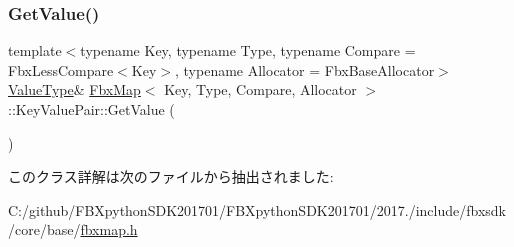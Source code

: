\mbox{\label{class_fbx_map_1_1_key_value_pair_ab06a5a6b1f2d03ae14a98a91cdfac643}} 
\subsubsection{\texorpdfstring{Get\+Value()}{GetValue()}\hspace{0.1cm}{\footnotesize\ttfamily [2/2]}}
{\footnotesize\ttfamily template$<$typename Key, typename Type, typename Compare = Fbx\+Less\+Compare$<$\+Key$>$, typename Allocator = Fbx\+Base\+Allocator$>$ \\
\hyperlink{class_fbx_map_1_1_key_value_pair_a716c83c1f6dabf173132b5acde84a9fe}{Value\+Type}\& \hyperlink{class_fbx_map}{Fbx\+Map}$<$ Key, Type, Compare, Allocator $>$\+::Key\+Value\+Pair\+::\+Get\+Value (\begin{DoxyParamCaption}{ }\end{DoxyParamCaption})}



このクラス詳解は次のファイルから抽出されました\+:\begin{DoxyCompactItemize}
\item 
C\+:/github/\+F\+B\+Xpython\+S\+D\+K201701/\+F\+B\+Xpython\+S\+D\+K201701/2017./include/fbxsdk/core/base/\hyperlink{fbxmap_8h}{fbxmap.\+h}\end{DoxyCompactItemize}
